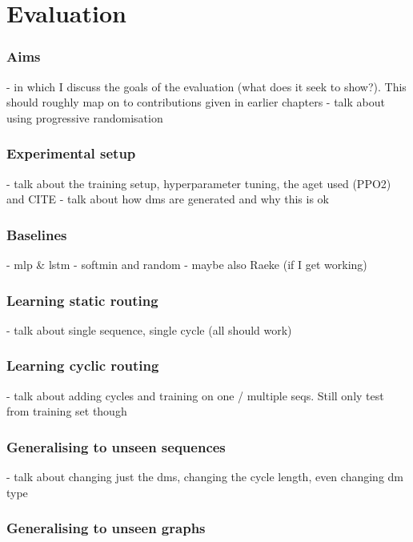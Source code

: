 \chapter{Evaluation}

\subsection{Aims}

- in which I discuss the goals of the evaluation (what does it seek to show?). This should roughly map on to contributions given in earlier chapters
- talk about using progressive randomisation

\subsection{Experimental setup}

- talk about the training setup, hyperparameter tuning, the aget used (PPO2) and CITE
- talk about how dms are generated and why this is ok

\subsection{Baselines}

- mlp \& lstm
- softmin and random
- maybe also Raeke (if I get working)

\subsection{Learning static routing}

- talk about single sequence, single cycle (all should work)

\subsection{Learning cyclic routing}

- talk about adding cycles and training on one / multiple seqs. Still only test from training set though

\subsection{Generalising to unseen sequences}

- talk about changing just the dms, changing the cycle length, even changing dm type

\subsection{Generalising to unseen graphs}

